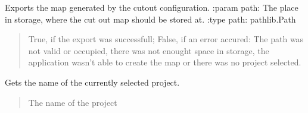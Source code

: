 \documentclass[letterpaper,10pt,english]{sphinxmanual}
\begin{document}
\begin{fulllineitems}
\begin{fulllineitems}
\begin{quote}
\begin{description}
\sphinxAtStartPar
{}

\end{description}\end{quote}

\end{fulllineitems}


\begin{fulllineitems}
\label{\detokenize{apidoc/src.osm_configurator.control:src.osm_configurator.control.control_interface.IControl.export_cut_out_map}}
\pysigstartsignatures
{}
\pysigstopsignatures
\sphinxAtStartPar
Exports the map generated by the cut\sphinxhyphen{}out configuration.
:param path: The place in storage, where the cut out map should be stored at.
:type path: pathlib.Path
\begin{quote}\begin{description}
\sphinxAtStartPar
True, if the export was successfull; False, if an error accured: The path was not valid or occupied, there was not enought space in storage, the application wasn’t able to create the map or there was no project selected.

\sphinxAtStartPar
{}

\end{description}\end{quote}

\end{fulllineitems}


\begin{fulllineitems}
\label{\detokenize{apidoc/src.osm_configurator.control:src.osm_configurator.control.control_interface.IControl.get_project_name}}
\pysigstartsignatures
{}
\pysigstopsignatures
\sphinxAtStartPar
Gets the name of the currently selected project.
\begin{quote}\begin{description}
\sphinxAtStartPar
The name of the project


\end{description}
\end{quote}
\end{fulllineitems}
\end{fulllineitems}
\end{document}
